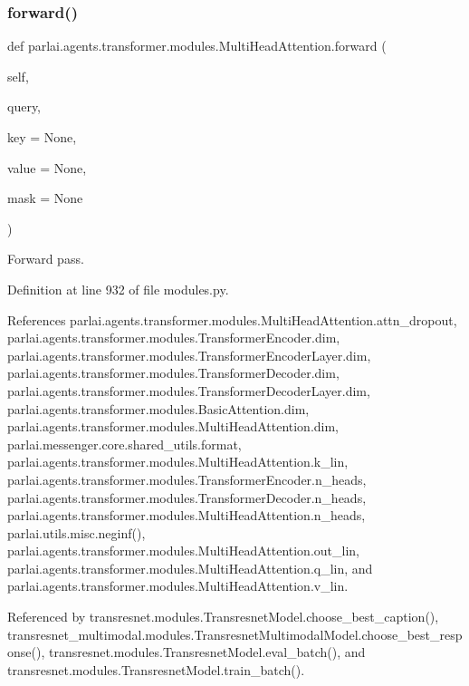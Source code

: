 \subsubsection{\texorpdfstring{forward()}{forward()}}
{\footnotesize\ttfamily def parlai.\+agents.\+transformer.\+modules.\+Multi\+Head\+Attention.\+forward (\begin{DoxyParamCaption}\item[{}]{self,  }\item[{}]{query,  }\item[{}]{key = {\ttfamily None},  }\item[{}]{value = {\ttfamily None},  }\item[{}]{mask = {\ttfamily None} }\end{DoxyParamCaption})}

\begin{DoxyVerb}Forward pass.\end{DoxyVerb}
 

Definition at line 932 of file modules.\+py.



References parlai.\+agents.\+transformer.\+modules.\+Multi\+Head\+Attention.\+attn\+\_\+dropout, parlai.\+agents.\+transformer.\+modules.\+Transformer\+Encoder.\+dim, parlai.\+agents.\+transformer.\+modules.\+Transformer\+Encoder\+Layer.\+dim, parlai.\+agents.\+transformer.\+modules.\+Transformer\+Decoder.\+dim, parlai.\+agents.\+transformer.\+modules.\+Transformer\+Decoder\+Layer.\+dim, parlai.\+agents.\+transformer.\+modules.\+Basic\+Attention.\+dim, parlai.\+agents.\+transformer.\+modules.\+Multi\+Head\+Attention.\+dim, parlai.\+messenger.\+core.\+shared\+\_\+utils.\+format, parlai.\+agents.\+transformer.\+modules.\+Multi\+Head\+Attention.\+k\+\_\+lin, parlai.\+agents.\+transformer.\+modules.\+Transformer\+Encoder.\+n\+\_\+heads, parlai.\+agents.\+transformer.\+modules.\+Transformer\+Decoder.\+n\+\_\+heads, parlai.\+agents.\+transformer.\+modules.\+Multi\+Head\+Attention.\+n\+\_\+heads, parlai.\+utils.\+misc.\+neginf(), parlai.\+agents.\+transformer.\+modules.\+Multi\+Head\+Attention.\+out\+\_\+lin, parlai.\+agents.\+transformer.\+modules.\+Multi\+Head\+Attention.\+q\+\_\+lin, and parlai.\+agents.\+transformer.\+modules.\+Multi\+Head\+Attention.\+v\+\_\+lin.



Referenced by transresnet.\+modules.\+Transresnet\+Model.\+choose\+\_\+best\+\_\+caption(), transresnet\+\_\+multimodal.\+modules.\+Transresnet\+Multimodal\+Model.\+choose\+\_\+best\+\_\+response(), transresnet.\+modules.\+Transresnet\+Model.\+eval\+\_\+batch(), and transresnet.\+modules.\+Transresnet\+Model.\+train\+\_\+batch().

